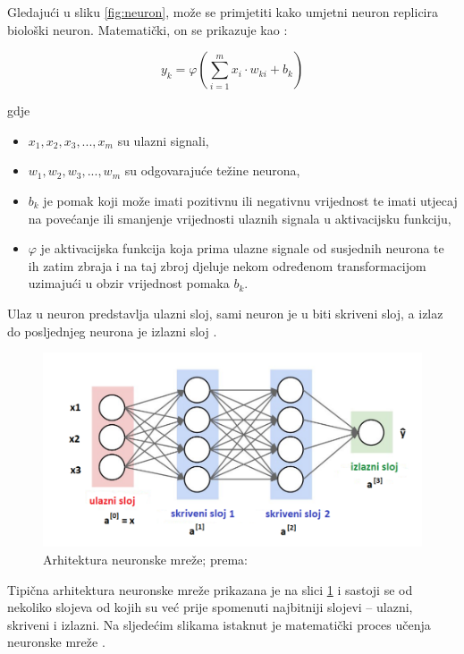 \documentclass[]{foi} %
\begin{document}
Gledajući u sliku \ref{fig:neuron}, može se primjetiti kako umjetni neuron replicira biološki neuron. Matematički, on se prikazuje kao \cite{principles}:

\[
y_k=\varphi\left(\sum_{i=1}^m x_i \cdot w_{k i}+b_k\right)
\]

gdje
\begin{itemize}
    \item $x_1, x_2, x_3, ..., x_m$ su ulazni signali,
    \item $w_1, w_2, w_3, ..., w_m$ su odgovarajuće težine neurona,
    \item $b_k$ je pomak koji može imati pozitivnu ili negativnu vrijednost te imati utjecaj na povećanje ili smanjenje vrijednosti ulaznih signala u aktivacijsku funkciju,
    \item $\varphi$ je aktivacijska funkcija koja prima ulazne signale od susjednih neurona te ih zatim zbraja i na taj zbroj djeluje nekom određenom transformacijom uzimajući u obzir vrijednost pomaka $b_k$.
\end{itemize}

Ulaz u neuron predstavlja ulazni sloj, sami neuron je u biti skriveni sloj, a izlaz do posljednjeg neurona je izlazni sloj \cite{builtin1}.

\begin{figure}[!ht]
    \centering
    \includegraphics[width=1\textwidth]{slike/mreza.png}
    \caption{Arhitektura neuronske mreže; prema: \cite{builtin1}}
    \label{fig:arhitektura}
\end{figure}

Tipična arhitektura neuronske mreže prikazana je na slici \ref{fig:arhitektura} i sastoji se od nekoliko slojeva od kojih su već prije spomenuti najbitniji slojevi -- ulazni, skriveni i izlazni. Na sljedećim slikama istaknut je matematički proces učenja neuronske mreže \cite{builtin1}.
\end{document}
